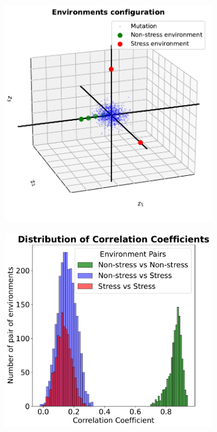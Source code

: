 \documentclass[11pt]{article}
\begin{document}
\begin{figure}
\begin{subfigure}{.5\textwidth}
  \includegraphics[width=0.99\linewidth]{environment_configuration.pdf}
  \caption{}
  \label{fig:sfig4a}
\end{subfigure}%
\begin{subfigure}{.5\textwidth}
  \includegraphics[width=1\linewidth]{correlation_simulation.pdf}

\end{subfigure}
\end{figure}
\end{document}

